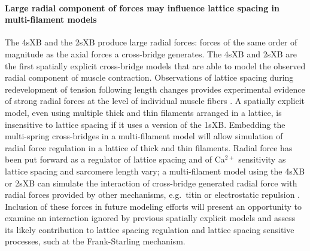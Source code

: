 \documentclass[]{article}
\begin{document}
\paragraph{Large radial component of forces may influence lattice spacing in multi-filament models} %
The 4sXB and the 2sXB produce large radial forces: forces of the same order of magnitude as the axial forces a cross-bridge generates. 
The 4sXB and 2sXB are the first spatially explicit cross-bridge models that are able to model the observed radial component of muscle contraction.
Observations of lattice spacing during redevelopment of tension following length changes provides experimental evidence of strong radial forces at the level of individual muscle fibers \citep{Cecchi1990}. %
A spatially explicit model, even using multiple thick and thin filaments arranged in a lattice, is insensitive to lattice spacing if it uses a version of the 1sXB.
Embedding the multi-spring cross-bridges in a multi-filament model will allow simulation of radial force regulation in a lattice of thick and thin filaments.  
Radial force has been put forward as a regulator of lattice spacing and of Ca$^{2+}$ sensitivity as lattice spacing and sarcomere length vary; a multi-filament model using the 4sXB or 2sXB can simulate the interaction of cross-bridge generated radial force with radial forces provided by other mechanisms, e.g.\ titin or electrostatic repulsion \citep{Martyn2004, Cazorla2001}. %
Inclusion of these forces in future modeling efforts will present an opportunity to examine an interaction ignored by previous spatially explicit models and assess its likely contribution to lattice spacing regulation and lattice spacing sensitive processes, such at the Frank-Starling mechanism. %
\end{document}
